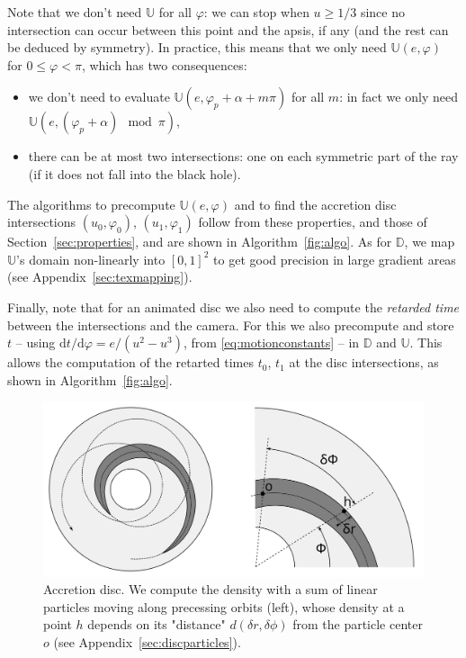 \documentclass{document}
\newcommand{\diff}{\mathrm d}
\begin{document}
Note that we don't need $\mathbb{U}$ for all $\varphi$: we can stop when $u \ge 
1 / 3$ since no intersection can occur between this point and the apsis, if any 
(and the rest can be deduced by symmetry). In practice, this means that we only 
need $\mathbb{U}(e, \varphi)$ for $0 \le \varphi < \pi$, which has two 
consequences:
\begin{itemize}
	\item we don't need to evaluate $\mathbb{U}(e, \varphi_p + \alpha + m\pi)$ 
	for all $m$: in fact we only need $\mathbb{U}(e, (\varphi_p+\alpha)\mod\pi)$,
	\item there can be at most two intersections: one on each symmetric part of 
	the ray (if it does not fall into the black hole).
\end{itemize}
The algorithms to precompute $\mathbb{U}(e, \varphi)$ and to find the accretion 
disc intersections $(u_0, \varphi_0)$, $(u_1, \varphi_1)$ follow from these 
properties, and those of Section~\ref{sec:properties}, and are shown in 
Algorithm~\ref{fig:algo}. As for $\mathbb{D}$, we map $\mathbb{U}$'s domain 
non-linearly into $[0,1]^2$ to get good precision in large gradient areas (see 
Appendix~\ref{sec:texmapping}).

Finally, note that for an animated disc we also need to compute the {\em 
retarded time} between the intersections and the camera. For this we also 
precompute and store $t$ -- using $\diff t / \diff\varphi = e / (u^2 - u^3)$, 
from \eqref{eq:motionconstants} -- in $\mathbb{D}$ and $\mathbb{U}$. This 
allows the computation of the retarted times $t_0$, $t_1$ at the disc 
intersections, as shown in Algorithm~\ref{fig:algo}.

\begin{figure}[t]
	\centering
	\includegraphics[width=\linewidth]{figures/disc}
	\caption{\label{fig:disc}Accretion disc. We compute the density with a 
	sum of linear particles moving along precessing orbits (left), whose density 
	at a point $h$ depends on its "distance" $d(\delta r, \delta\phi)$ from the 
	particle center $o$ (see Appendix~\ref{sec:discparticles}).}
\end{figure}
\end{document}
